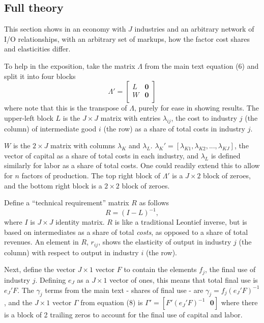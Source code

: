 \documentclass[11pt]{article}
\begin{document}
\subsection{Full theory}
This section shows in an economy with $J$ industries and an arbitrary network of I/O relationships, with an arbitrary set of markups, how the factor cost shares and elasticities differ. 

To help in the exposition, take the matrix $\Lambda$ from the main text equation (6) and split it into four blocks
\begin{equation}
	\Lambda' = 
	\begin{bmatrix}
		L & \mathbf{0} \\
		W & \mathbf{0} \\
	\end{bmatrix} \label{EQ_Lambda}
\end{equation}
where note that this is the transpose of $\Lambda$, purely for ease in showing results. The upper-left block $L$ is the $J \times J$ matrix with entries $\lambda_{ij}$, the cost to industry $j$ (the column) of intermediate good $i$ (the row) as a share of total costs in industry $j$. 

$W$ is the $2 \times J$ matrix with columns $\lambda_K$ and $\lambda_L$. $\lambda_K' = [\lambda_{K1}, \lambda_{K2}, ..., \lambda_{KJ}]$, the vector of capital as a share of total costs in each industry, and $\lambda_L$ is defined similarly for labor as a share of total costs. One could readily extend this to allow for $n$ factors of production. The top right block of $\Lambda'$ is a $J \times 2$ block of zeroes, and the bottom right block is a $2 \times 2$ block of zeroes. 

Define a ``technical requirement'' matrix $R$ as follows
\begin{equation}
	R = (I - L)^{-1},
\end{equation}
where $I$ is $J \times J$ identity matrix. $R$ is like a traditional Leontief inverse, but is based on intermediates as a share of total \textit{costs}, as opposed to a share of total revenues. An element in $R$, $r_{ij}$, shows the elasticity of output in industry $j$ (the column) with respect to output in industry $i$ (the row).

Next, define the vector $J \times 1$ vector $F$ to contain the elements $f_j$, the final use of industry $j$. Defining $e_J$ as a $J \times 1$ vector of ones, this means that total final use is $e_J'F$. The $\gamma_j$ terms from the main text - shares of final use - are $\gamma_j = f_j(e_J'F)^{-1}$, and the $J \times 1$ vector $\Gamma$ from equation (8) is $\Gamma' = [F'(e_J'F)^{-1} \text{ } \mathbf{0}]$ where there is a block of 2 trailing zeros to account for the final use of capital and labor.
\end{document}
